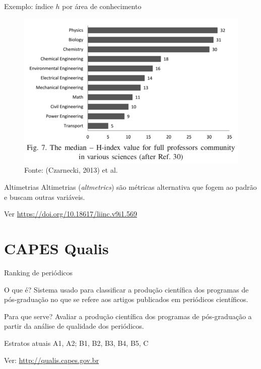 \begin{frame}{Exemplo: índice $h$ por área de conhecimento}

\begin{figure}
\includegraphics[scale=0.35]{figs/03/median-h}
\caption{Fonte: (Czarnecki, 2013) et al.}
\end{figure}

\end{frame}

\begin{frame}{Altimetrias}
Altimetrias (\textit{altmetrics}) são métricas alternativa que fogem ao padrão e buscam outras variáveis.

Ver \url{https://doi.org/10.18617/liinc.v9i1.569}
\end{frame}

\section{CAPES Qualis}

\begin{frame}{Ranking de periódicos}
\begin{block}{O que é?}
Sistema usado para classificar a produção científica dos programas de pós-graduação no que se refere aos artigos publicados em periódicos científicos.
\end{block}
\begin{block}{Para que serve?}
Avaliar a produção científica dos programas de pós-graduação a partir da análise de qualidade dos periódicos.
\end{block}
\begin{block}{Estratos atuais}
A1, A2; B1, B2, B3, B4, B5, C
\end{block}

Ver: \url{http://qualis.capes.gov.br}
\end{frame}


